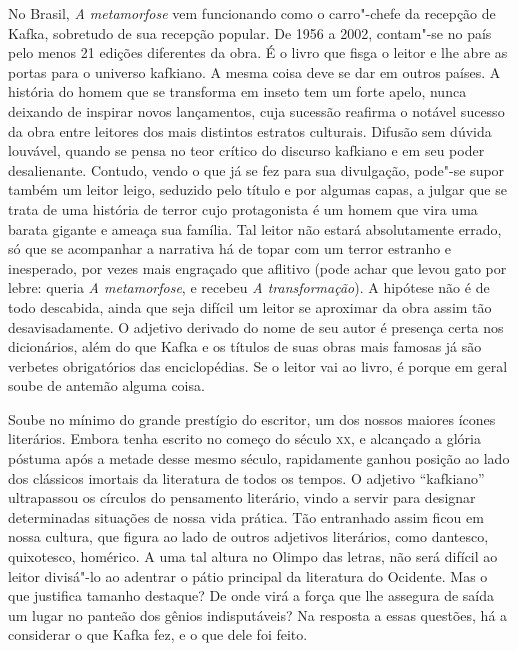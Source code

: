 No Brasil, \textit{A metamorfose} vem funcionando como o carro"-chefe
da recepção de Kafka, sobretudo de sua recepção popular. De 1956 a
2002, contam"-se no país pelo menos 21 edições diferentes da
obra. É o livro que fisga o leitor e lhe abre as
portas para o universo kafkiano. A mesma coisa deve se dar em outros países. A história do
homem que se transforma em inseto tem um forte apelo, nunca deixando de
inspirar novos lançamentos, cuja sucessão reafirma o notável sucesso da
obra entre leitores dos mais distintos estratos culturais. Difusão sem
dúvida louvável, quando se pensa no teor crítico do discurso kafkiano e
em seu poder desalienante. Contudo, vendo o que já se fez para sua
divulgação, pode"-se supor também um leitor leigo, seduzido pelo
título e por algumas capas, a julgar que se trata de uma história de
terror cujo protagonista é um homem que vira uma barata gigante e
ameaça sua família. Tal leitor não estará absolutamente errado, só que
se acompanhar a narrativa há de topar com um terror estranho e
inesperado, por vezes mais engraçado que aflitivo (pode achar que
levou gato por lebre: queria \textit{A metamorfose}, e recebeu
\textit{A transformação}). A hipótese não é de todo descabida, ainda
que seja difícil um leitor se aproximar da obra assim tão
desavisadamente. O adjetivo derivado do nome de seu autor é presença
certa nos dicionários, além do que Kafka e os títulos de suas obras
mais famosas já são verbetes obrigatórios das enciclopédias. Se o
leitor vai ao livro, é porque em geral soube de antemão alguma coisa.

Soube no mínimo do grande prestígio do escritor, um dos nossos maiores
ícones literários. Embora tenha escrito no começo do século \textsc{xx}, e
alcançado a glória póstuma após a metade desse mesmo século,
rapidamente ganhou posição ao lado dos clássicos imortais da literatura
de todos os tempos. O adjetivo “kafkiano” ultrapassou os círculos do
pensamento literário, vindo a servir para designar determinadas
situações de nossa vida prática. Tão entranhado assim ficou em nossa
cultura, que figura ao lado de outros adjetivos literários, como dantesco, quixotesco,
homérico. A uma tal altura no Olimpo das letras, não será difícil ao
leitor divisá"-lo ao adentrar o pátio principal da literatura do
Ocidente. Mas o que justifica tamanho destaque? De onde virá a força
que lhe assegura de saída um lugar no panteão dos gênios indisputáveis?
Na resposta a essas questões, há a considerar o que Kafka fez, e o que
dele foi feito.

